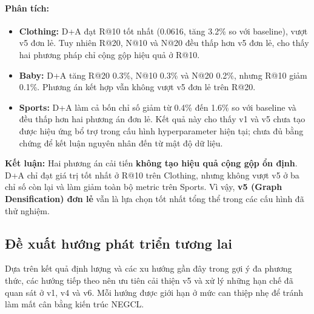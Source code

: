 \paragraph{Phân tích:}
\begin{itemize}[leftmargin=*,labelsep=6pt]
    \item \textbf{Clothing:} D+A đạt R@10 tốt nhất (0.0616, tăng 3.2\% so với baseline), vượt v5 đơn lẻ. Tuy nhiên R@20, N@10 và N@20 đều thấp hơn v5 đơn lẻ, cho thấy hai phương pháp chỉ cộng gộp hiệu quả ở R@10.
    \item \textbf{Baby:} D+A tăng R@20 0.3\%, N@10 0.3\% và N@20 0.2\%, nhưng R@10 giảm 0.1\%. Phương án kết hợp vẫn không vượt v5 đơn lẻ trên R@20.
    \item \textbf{Sports:} D+A làm cả bốn chỉ số giảm từ 0.4\% đến 1.6\% so với baseline và đều thấp hơn hai phương án đơn lẻ. Kết quả này cho thấy v1 và v5 chưa tạo được hiệu ứng bổ trợ trong cấu hình hyperparameter hiện tại; chưa đủ bằng chứng để kết luận nguyên nhân đến từ mật độ dữ liệu.
\end{itemize}

\textbf{Kết luận:} Hai phương án cải tiến \textbf{không tạo hiệu quả cộng gộp ổn định}. D+A chỉ đạt giá trị tốt nhất ở R@10 trên Clothing, nhưng không vượt v5 ở ba chỉ số còn lại và làm giảm toàn bộ metric trên Sports. Vì vậy, \textbf{v5 (Graph Densification) đơn lẻ} vẫn là lựa chọn tốt nhất tổng thể trong các cấu hình đã thử nghiệm.


\subsection{Đề xuất hướng phát triển tương lai}

Dựa trên kết quả định lượng và các xu hướng gần đây trong gợi ý đa phương thức, các hướng tiếp theo nên ưu tiên cải thiện v5 và xử lý những hạn chế đã quan sát ở v1, v4 và v6. Mỗi hướng được giới hạn ở mức can thiệp nhẹ để tránh làm mất cân bằng kiến trúc NEGCL.

